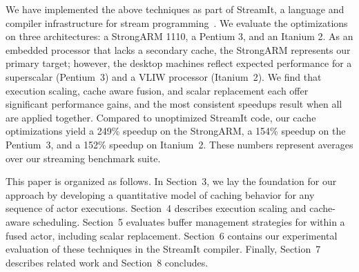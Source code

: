 We have implemented the above techniques as part of StreamIt, a
language and compiler infrastructure for stream
programming~\cite{streamitcc}.  We evaluate the optimizations on three
architectures: a StrongARM 1110, a Pentium 3, and an Itanium 2.  As an
embedded processor that lacks a secondary cache, the StrongARM
represents our primary target; however, the desktop machines reflect
expected performance for a superscalar (Pentium~3) and a VLIW
processor (Itanium~2).  We find that execution scaling, cache aware
fusion, and scalar replacement each offer significant performance
gains, and the most consistent speedups result when all are applied
together.  Compared to unoptimized StreamIt code, our cache
optimizations yield a 249\% speedup on the StrongARM, a 154\% speedup
on the Pentium~3, and a 152\% speedup on Itanium~2.  These numbers
represent averages over our streaming benchmark suite.

This paper is organized as follows.  In Section~3, we lay the
foundation for our approach by developing a quantitative model of
caching behavior for any sequence of actor executions.  Section~4
describes execution scaling and cache-aware scheduling.  Section~5
evaluates buffer management strategies for within a fused actor,
including scalar replacement.  Section~6 contains our experimental
evaluation of these techniques in the StreamIt compiler.  Finally,
Section~7 describes related work and Section~8 concludes.


